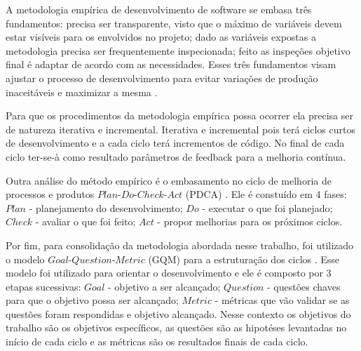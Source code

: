 A metodologia empírica de desenvolvimento de software se embasa três fundamentos: precisa ser transparente, visto que o máximo de variáveis devem estar visíveis para os envolvidos no projeto; dado as variáveis expostas a metodologia precisa ser frequentemente inspecionada; feito as inspeções objetivo final é adaptar de acordo com as necessidades. Esses três fundamentos visam ajustar o processo de desenvolvimento para evitar variações de produção inaceitáveis e maximizar a mesma \cite{empirical}.

Para que os procedimentos da metodologia empírica possa ocorrer ela precisa ser de natureza iterativa e incremental. Iterativa e incremental pois terá ciclos curtos de desenvolvimento e a cada ciclo terá incrementos de código. No final de cada ciclo ter-se-à como resultado parâmetros de feedback para a melhoria contínua.

Outra análise do método empírico é o embasamento no ciclo de melhoria de processos e produtos $Plan$-$Do$-$Check$-$Act$ (PDCA) \cite{pdca}. Ele é constuído em 4 fases: $Plan$ - planejamento do desenvolvimento; $Do$ - executar o que foi planejado; $Check$ - avaliar o que foi feito; $Act$ - propor melhorias para os próximos ciclos.

Por fim, para consolidação da metodologia abordada nesse trabalho, foi utilizado o modelo $Goal$-$Question$-$Metric$ (GQM) para a estruturação dos ciclos \cite{gqm}. Esse modelo foi utilizado para orientar o desenvolvimento e ele é composto por 3 etapas sucessivas: $Goal$ - objetivo a ser alcançado; $Question$ - questões chaves para que o objetivo possa ser alcançado; $Metric$ - métricas que vão validar se as questões foram respondidas e objetivo alcançado. Nesse contexto os objetivos do trabalho são os objetivos específicos, as questões são as hipotéses levantadas no início de cada ciclo e as métricas são os resultados finais de cada ciclo.


